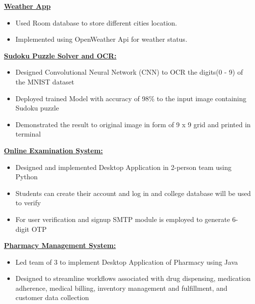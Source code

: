 \documentclass[11pt]{article}
\begin{document}
    \hspace{8pt}
    \href{https://github.com/Abhay811/Weather-App}{\textbf{Weather App}}
    \hfill
        \begin{itemize}
        \setlength{\itemsep}{0pt}
        \setlength{\parskip}{0pt}
        \setlength{\parsep}{0pt}
        \item Used Room database to store different cities location.
        \item Implemented using OpenWeather Api for weather status.
        \end{itemize}
    \hspace{8pt}
    \href{https://github.com/Abhay811/Sudoku_solver}{\textbf{Sudoku Puzzle Solver and OCR:}}
    \hfill
       \begin{itemize}
        \setlength\itemsep{0pt}
        \setlength\parskip{0pt}
        \setlength\parsep{0pt}
        \item  Designed Convolutional Neural Network (CNN) to OCR the digits(0 - 9) of the MNIST dataset
        \item Deployed trained Model with accuracy of 98\% to the input image containing Sudoku puzzle
        \item Demonstrated the result to original image in form of 9 x 9 grid and printed in terminal
        \end{itemize}
    \hspace{8pt}\href{https://github.com/Abhay811/Advanced-Online-Examination}{\textbf{Online Examination System:}}
    \hfill
    \begin{itemize}
        \setlength{\itemsep}{0pt}
        \setlength{\parskip}{0pt}
        \setlength{\parsep}{0pt}
        \item Designed and implemented Desktop Application in 2-person team using Python
        \item Students can create their account and log in and college database will be used to verify
        \item For user verification and signup SMTP module is employed to generate 6-digit OTP
    \end{itemize}
    \hspace{8pt}\href{https://github.com/Abhay811/Advanced-Online-Examination}{\textbf{Pharmacy Management System:}}
    \hfill
    \begin{itemize}
        \setlength{\itemsep}{0pt}
        \setlength{\parskip}{0pt}
        \setlength{\parsep}{0pt}
        \item Led team of 3 to implement Desktop Application of Pharmacy using Java
        \item Designed to streamline workflows associated with drug dispensing, medication adherence, medical billing, inventory management and fulfillment, and customer data collection
        \end{itemize}
    
\end{document}
